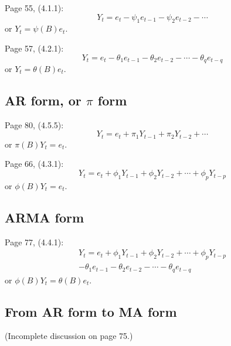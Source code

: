 \documentclass[12pt]{article}
\begin{document}
Page 55, (4.1.1):
\begin{equation}\label{eq:psi-form}
Y_t = e_t - \psi_1 e_{t-1} - \psi_2 e_{t-2} -\dotsb
\end{equation}
or
$
Y_t = \psi(B) e_t
$.

Page 57, (4.2.1):
\begin{equation}\label{eq:MA-form}
Y_t = e_t - \theta_1 e_{t-1} - \theta_2 e_{t-2}
    -\dotsb - \theta_q e_{t-q}
\end{equation}
or
$
Y_t = \theta(B) e_t
$.

\subsection{AR form, or $\pi$ form}

Page 80, (4.5.5):
\begin{equation}\label{eq:pi-form}
Y_t = e_t + \pi_1 Y_{t-1} + \pi_2 Y_{t-2} +\dotsb
\end{equation}
or
$
\pi(B) Y_{t} = e_t
$.

Page 66, (4.3.1):
\begin{equation}\label{eq:AR-form}
Y_t = e_t + \phi_1 Y_{t-1} + \phi_2 Y_{t-2}
    +\dotsb + \phi_p Y_{t-p}
\end{equation}
or
$
\phi(B) Y_t = e_t
$.

\subsection{ARMA form}

Page 77, (4.4.1):
\begin{multline}\label{eq:ARMA-form}
Y_t = e_t
    + \phi_1 Y_{t-1} + \phi_2 Y_{t-2} +\dotsb+ \phi_p Y_{t-p}
    \\
    - \theta_1 e_{t-1} - \theta_2 e_{t-2} -\dotsb- \theta_q e_{t-q}
\end{multline}
or
$
\phi(B)Y_t = \theta(B) e_t
$.

\subsection{From AR form to MA form}

(Incomplete discussion on page 75.)
\end{document}
